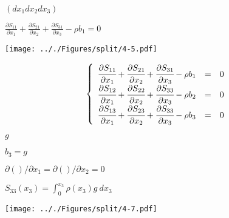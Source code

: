 \documentclass[onecolumn,11pt]{report}
\def\lthtmlcheckvsize{\ifdim\ht\sizebox<\vsize 
  \ifdim\wd\sizebox<\hsize\expandafter\hfill\fi \expandafter\vfill
  \else\expandafter\vss\fi}%
\begin{document}
{\newpage\clearpage
{}%
$ (dx_1 dx_2 dx_3)$%
\lthtmlindisplaymathZ
\lthtmlcheckvsize\clearpage}

{\newpage\clearpage
{}%
$\displaystyle \frac{\partial S_{11}}{\partial x_1} +
\frac{\partial S_{21}}{\partial x_2} +
\frac{\partial S_{31}}{\partial x_3} -
\rho b_1 = 0$%
\lthtmlindisplaymathZ
\lthtmlcheckvsize\clearpage}

{\newpage\clearpage
{}%
\texttt{[image: .././Figures/split/4-5.pdf]}%
\lthtmlpictureZ
\lthtmlcheckvsize\clearpage}

{\newpage\clearpage
{}%
\begin{displaymath}\displaystyle
\left\lbrace
\begin{array}{rcl}
\cfrac{\partial S_{11}}{\partial x_1} +
\cfrac{\partial S_{21}}{\partial x_2} +
\cfrac{\partial S_{31}}{\partial x_3} -
\rho b_1 & = & 0 \\
\cfrac{\partial S_{12}}{\partial x_1} +
\cfrac{\partial S_{22}}{\partial x_2} +
\cfrac{\partial S_{33}}{\partial x_3} -
\rho b_2 & = & 0 \\
\cfrac{\partial S_{13}}{\partial x_1} +
\cfrac{\partial S_{23}}{\partial x_2} +
\cfrac{\partial S_{33}}{\partial x_3} -
\rho b_3 & = & 0 \\
\end{array}
\right.\end{displaymath}%
\lthtmldisplayZ
\lthtmlcheckvsize\clearpage}

{\newpage\clearpage
{}%
$ g$%
\lthtmlindisplaymathZ
\lthtmlcheckvsize\clearpage}

{\newpage\clearpage
{}%
$ b_3 = g$%
\lthtmlindisplaymathZ
\lthtmlcheckvsize\clearpage}

{\newpage\clearpage
{}%
$ \partial()/\partial x_1 = \partial()/\partial x_2 = 0$%
\lthtmlindisplaymathZ
\lthtmlcheckvsize\clearpage}

{\newpage\clearpage
{}%
$\displaystyle S_{33}(x_3) = \int_0^{x_3} \rho(x_3) g \: dx_3$%
\lthtmlindisplaymathZ
\lthtmlcheckvsize\clearpage}

{\newpage\clearpage
{}%
\texttt{[image: .././Figures/split/4-7.pdf]}%
\lthtmlpictureZ
\lthtmlcheckvsize\clearpage}
\end{document}
